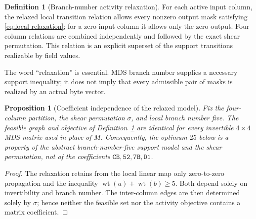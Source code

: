 \documentclass[10pt,reqno]{amsart}
\theoremstyle{plain}
\newtheorem{proposition}[theorem]{Proposition}
\theoremstyle{remark}\newtheorem{remark}[theorem]{Remark}
\theoremstyle{definition}\newtheorem{definition}[theorem]{Definition}
\begin{document}
\begin{definition}[Branch-number activity relaxation]\label{def:activity-relaxation}
For each active input column, the relaxed local transition relation allows every nonzero output mask satisfying \eqref{eq:local-relaxation}; for a zero input column it allows only the zero output. Four column relations are combined independently and followed by the exact shear permutation. This relation is an explicit superset of the support transitions realizable by field values.
\end{definition}

The word ``relaxation'' is essential. MDS branch number supplies a necessary support inequality; it does not imply that every admissible pair of masks is realized by an actual byte vector.

\begin{proposition}[Coefficient independence of the relaxed model]\label{prop:coefficient-independent}
Fix the four-column partition, the shear permutation $\sigma$, and local branch number five. The feasible graph and objective of Definition~\ref{def:activity-relaxation} are identical for every invertible $4\times4$ MDS matrix used in place of $M$. Consequently, the optimum $25$ below is a property of the abstract branch-number-five support model and the shear permutation, not of the coefficients $\mathtt{CB},\mathtt{52},\mathtt{7B},\mathtt{D1}$.
\end{proposition}
\begin{proof}
The relaxation retains from the local linear map only zero-to-zero propagation and the inequality $\operatorname{wt}(a)+\operatorname{wt}(b)\ge5$. Both depend solely on invertibility and branch number. The inter-column edges are then determined solely by $\sigma$; hence neither the feasible set nor the activity objective contains a matrix coefficient.
\end{proof}
\end{document}
